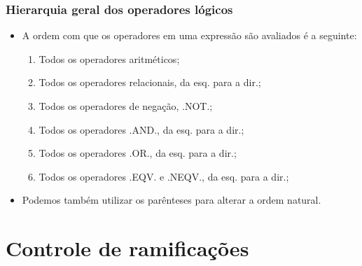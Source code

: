 \documentclass[xcolor=table]{beamer}
\newenvironment{stepenumerate}{\begin{enumerate}[<+->]}{\end{enumerate}}
\newenvironment{stepitemize}{\begin{itemize}[<+->]}{\end{itemize} }
\begin{document}
\begin{frame}%

\frametitle{Hierarquia geral dos operadores l\'{o}gicos}

\begin{stepitemize}
\item A ordem com que os operadores em uma express\~{a}o s\~{a}o avaliados 
\'{e} a seguinte:

\begin{stepenumerate}
\item Todos os operadores aritm\'{e}ticos;

\item Todos os operadores relacionais, da esq. para a dir.;

\item Todos os operadores de nega\c{c}\~{a}o, .NOT.;

\item Todos os operadores .AND., da esq. para a dir.;

\item Todos os operadores .OR., da esq. para a dir.;

\item Todos os operadores .EQV. e .NEQV., da esq. para a dir.;
\end{stepenumerate}

\item Podemos tamb\'{e}m utilizar os par\^{e}nteses para alterar a ordem
natural.
\end{stepitemize}

\transboxout%
\end{frame}%

\section{Controle de ramifica\c{c}\~{o}es}
\end{document}
